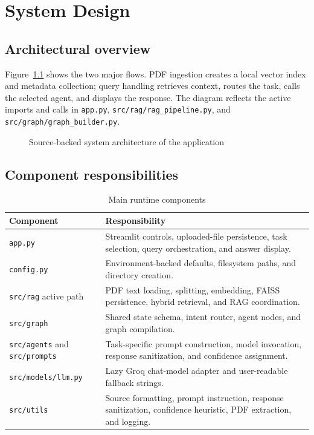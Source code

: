 \chapter{System Design}
\label{ch:design}

\section{Architectural overview}
Figure~\ref{fig:architecture} shows the two major flows. PDF ingestion creates a local vector index and metadata collection; query handling retrieves context, routes the task, calls the selected agent, and displays the response. The diagram reflects the active imports and calls in \texttt{app.py}, \texttt{src/rag/rag\_pipeline.py}, and \texttt{src/graph/graph\_builder.py}.

\begin{figure}[htbp]
\centering
\resizebox{0.98\textwidth}{!}{}
\caption{Source-backed system architecture of the application}
\label{fig:architecture}
\end{figure}

\section{Component responsibilities}
\begin{table}[htbp]
\centering
\caption{Main runtime components}
\label{tab:components}
\begin{tabularx}{\textwidth}{p{}Y}
\toprule
\textbf{Component} & \textbf{Responsibility}\\
\midrule
\texttt{app.py} & Streamlit controls, uploaded-file persistence, task selection, query orchestration, and answer display.\\
\texttt{config.py} & Environment-backed defaults, filesystem paths, and directory creation.\\
\texttt{src/rag} active path & PDF text loading, splitting, embedding, FAISS persistence, hybrid retrieval, and RAG coordination.\\
\texttt{src/graph} & Shared state schema, intent router, agent nodes, and graph compilation.\\
\texttt{src/agents} and \texttt{src/prompts} & Task-specific prompt construction, model invocation, response sanitization, and confidence assignment.\\
\texttt{src/models/llm.py} & Lazy Groq chat-model adapter and user-readable fallback strings.\\
\texttt{src/utils} & Source formatting, prompt instruction, response sanitization, confidence heuristic, PDF extraction, and logging.\\
\bottomrule
\end{tabularx}
\end{table}

